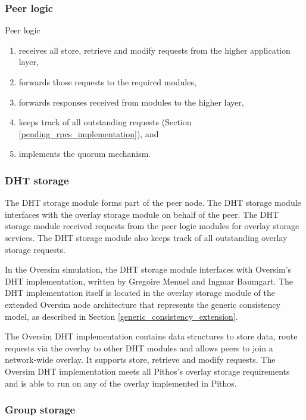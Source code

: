 \subsubsection{Peer logic}
Peer logic
\begin{enumerate}
  \item  receives all store, retrieve and modify requests from the higher application layer,
  \item forwards those requests to the required modules,
  \item forwards responses received from modules to the higher layer,
  \item keeps track of all outstanding requests (Section \ref{pending_rpcs_implementation}), and
  \item implements the quorum mechanism.
\end{enumerate}

\subsubsection{DHT storage}

The DHT storage module forms part of the peer node. The DHT storage module interfaces with the overlay storage module on behalf of the peer. The DHT storage module received requests from the peer logic modules for overlay storage services. The DHT storage module also keeps track of all outstanding overlay storage requests.

In the Oversim simulation, the DHT storage module interfaces with Oversim's DHT implementation, written by Gregoire Menuel and Ingmar Baumgart. The DHT implementation itself is located in the overlay storage module of the extended Oversim node architecture that represents the generic consistency model, as described in Section \ref{generic_consistency_extension}.

The Oversim DHT implementation contains data structures to store data, route requests via the overlay to other DHT modules and allows peers to join a network-wide overlay. It supports store, retrieve and modify requests. The Oversim DHT implementation meets all Pithos's overlay storage requirements and is able to run on any of the overlay implemented in Pithos.

\subsubsection{Group storage}

